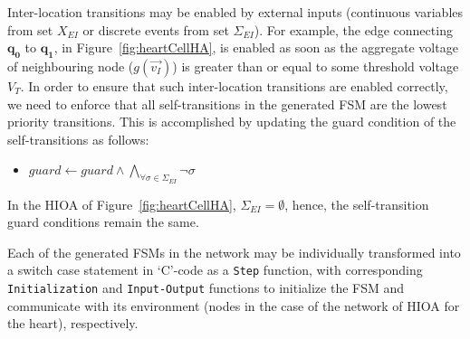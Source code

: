 Inter-location transitions may be enabled by external inputs (continuous 
variables from set $X_{EI}$ or discrete events from set $\Sigma_{EI}$). For 
example, the edge connecting $\mathbf{q_{0}}$ to $\mathbf{q_{1}}$, in 
Figure~\ref{fig:heartCellHA},
is enabled as soon as the aggregate voltage of neighbouring node
($g(\vec{v_{I}})$) is greater than or equal to some threshold voltage
$V_{T}$. In order to ensure that such inter-location transitions are
enabled correctly, we need to enforce that all self-transitions in the
generated \ac{FSM} are the lowest priority transitions. This is
accomplished by updating the guard condition of the self-transitions as
follows:
\begin{itemize}
\item
  $guard \leftarrow guard \wedge \bigwedge_{\forall \sigma \in
    \Sigma_{EI}} \neg \sigma$
\end{itemize}

In the \ac{HIOA} of Figure~\ref{fig:heartCellHA},
$\Sigma_{EI} = \emptyset$, hence, the self-transition guard conditions
remain the same.


Each of the generated \acp{FSM} in the network may be individually
transformed into a switch case statement in `C'-code as a \texttt{Step} 
function, with corresponding \texttt{Initialization} and \texttt{Input-Output}
functions to initialize the \ac{FSM} and communicate with its
environment (nodes in the case of the network of \ac{HIOA} for the heart),
respectively.


